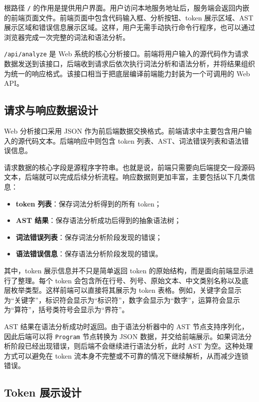 \documentclass[UTF8,a4paper,12pt]{ctexart}
\begin{document}
根路径 \texttt{/} 的作用是提供用户界面。用户访问本地服务地址后，服务端会返回内嵌的前端页面文件。前端页面中包含代码输入框、分析按钮、token 展示区域、AST 展示区域和错误信息展示区域。这样，用户无需手动执行命令行程序，也可以通过浏览器完成一次完整的词法和语法分析。

\texttt{/api/analyze} 是 Web 系统的核心分析接口。前端将用户输入的源代码作为请求数据发送到该接口，后端收到请求后依次执行词法分析和语法分析，并将结果组织为统一的响应格式。该接口相当于把底层编译前端能力封装为一个可调用的 Web API。

\subsection{请求与响应数据设计}

Web 分析接口采用 JSON 作为前后端数据交换格式。前端请求中主要包含用户输入的源代码文本。后端响应中则包含 token 列表、AST、词法错误列表和语法错误信息。

请求数据的核心字段是源程序字符串。也就是说，前端只需要向后端提交一段源码文本，后端就可以完成后续分析流程。响应数据则更加丰富，主要包括以下几类信息：

\begin{itemize}
    \item \textbf{token 列表}：保存词法分析得到的所有 token；
    \item \textbf{AST 结果}：保存语法分析成功后得到的抽象语法树；
    \item \textbf{词法错误列表}：保存词法分析阶段发现的错误；
    \item \textbf{语法错误信息}：保存语法分析阶段发现的错误。
\end{itemize}

其中，token 展示信息并不只是简单返回 token 的原始结构，而是面向前端显示进行了整理。每个 token 会包含所在行号、列号、原始文本、中文类别名称以及底层枚举类型。这样前端可以直接将其展示为 token 表格。例如，关键字会显示为“关键字”，标识符会显示为“标识符”，数字会显示为“数字”，运算符会显示为“算符”，括号类符号会显示为“界符”。

AST 结果在语法分析成功时返回。由于语法分析器中的 AST 节点支持序列化，因此后端可以将 \texttt{Program} 节点转换为 JSON 数据，并交给前端展示。如果词法分析阶段已经出现错误，则后端不会继续进行语法分析，此时 AST 为空。这种处理方式可以避免在 token 流本身不完整或不可靠的情况下继续解析，从而减少连锁错误。

\subsection{Token 展示设计}
\end{document}
